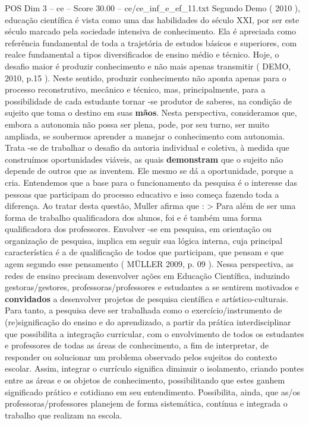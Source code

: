 \begin{textsample}{POS Dim 3 – ce – Score 30.00 – ce/ce\_inf\_e\_ef\_11.txt}
Segundo Demo ( 2010 ), educação científica é vista como uma das habilidades do século XXI, por ser este século marcado pela sociedade intensiva de conhecimento.
Ela é apreciada como referência fundamental de toda a trajetória de estudos básicos e superiores, com realce fundamental a tipos diversificados de ensino médio e técnico.
Hoje, o desafio maior é produzir conhecimento e não mais apenas transmitir ( DEMO, 2010, p.15 ).
Neste sentido, produzir conhecimento não aponta apenas para o processo reconstrutivo, mecânico e técnico, mas, principalmente, para a possibilidade de cada estudante tornar -se produtor de saberes, na condição de sujeito que toma o destino em suas \textbf{mãos}.
Nesta perspectiva, consideramos que, embora a autonomia não possa ser plena, pode, por seu turno, ser muito ampliada, se soubermos aprender a manejar o conhecimento com autonomia.
Trata -se de trabalhar o desafio da autoria individual e coletiva, à medida que construímos oportunidades viáveis, as quais \textbf{demonstram} que o sujeito não depende de outros que as inventem.
Ele mesmo se dá a oportunidade, porque a cria.
Entendemos que a base para o funcionamento da pesquisa é o interesse das pessoas que participam do processo educativo e isso começa fazendo toda a diferença.
Ao tratar desta questão, Muller afirma que : > Para além de ser uma forma de trabalho qualificadora dos alunos, foi e é também uma forma qualificadora dos professores.
Envolver -se em pesquisa, em orientação ou organização de pesquisa, implica em seguir sua lógica interna, cuja principal característica é a de qualificação de todos que participam, que pensam e que agem segundo esse pensamento ( MÜLLER 2009, p. 09 ).
Nessa perspectiva, as redes de ensino precisam desenvolver ações em Educação Científica, induzindo gestoras/gestores, professoras/professores e estudantes a se sentirem motivados e \textbf{convidados} a desenvolver projetos de pesquisa científica e artístico-culturais.
Para tanto, a pesquisa deve ser trabalhada como o exercício/instrumento de (re)significação do ensino e do aprendizado, a partir da prática interdisciplinar que possibilita a integração curricular, com o envolvimento de todos os estudantes e professores de todas as áreas de conhecimento, a fim de interpretar, de responder ou solucionar um problema observado pelos sujeitos do contexto escolar.
Assim, integrar o currículo significa diminuir o isolamento, criando pontes entre as áreas e os objetos de conhecimento, possibilitando que estes ganhem significado prático e cotidiano em seu entendimento.
Possibilita, ainda, que as/os professoras/professores planejem de forma sistemática, contínua e integrada o trabalho que realizam na escola.

\end{textsample}

